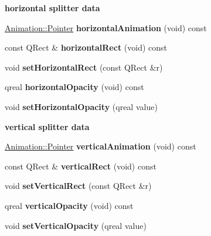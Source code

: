 \begin{Indent}\textbf{ horizontal splitter data}\par
\begin{DoxyCompactItemize}
\item 
\mbox{\label{class_dock_separator_data_a392ea21a3b247c0c32bc185f7919a85b}} 
\hyperlink{class_animation_ac48a8d074abd43dc3f6485353ba24e30}{Animation\+::\+Pointer} {\bfseries horizontal\+Animation} (void) const
\item 
\mbox{\label{class_dock_separator_data_a2ae548ffbc3f67c7ca20e471b423a0c9}} 
const Q\+Rect \& {\bfseries horizontal\+Rect} (void) const
\item 
\mbox{\label{class_dock_separator_data_acca36132c9efd0bcb646a02deaed3faa}} 
void {\bfseries set\+Horizontal\+Rect} (const Q\+Rect \&r)
\item 
\mbox{\label{class_dock_separator_data_a7acc7fad5de94267b1233e004b7f2bf8}} 
qreal {\bfseries horizontal\+Opacity} (void) const
\item 
\mbox{\label{class_dock_separator_data_a63cb32b142f8cd491f59eba0bc8665a9}} 
void {\bfseries set\+Horizontal\+Opacity} (qreal value)
\end{DoxyCompactItemize}
\end{Indent}
\begin{Indent}\textbf{ vertical splitter data}\par
\begin{DoxyCompactItemize}
\item 
\mbox{\label{class_dock_separator_data_a937e6edd7c01a3d4f393e7a5b0e814df}} 
\hyperlink{class_animation_ac48a8d074abd43dc3f6485353ba24e30}{Animation\+::\+Pointer} {\bfseries vertical\+Animation} (void) const
\item 
\mbox{\label{class_dock_separator_data_a637ff49b7031a047b5809197f9a5b37f}} 
const Q\+Rect \& {\bfseries vertical\+Rect} (void) const
\item 
\mbox{\label{class_dock_separator_data_adddd22de1066f87f3e01654c3fe8d69b}} 
void {\bfseries set\+Vertical\+Rect} (const Q\+Rect \&r)
\item 
\mbox{\label{class_dock_separator_data_adae158146c224c27f2d81d91cb0f6692}} 
qreal {\bfseries vertical\+Opacity} (void) const
\item 
\mbox{\label{class_dock_separator_data_a7aa0f77c154ef30a327f9f0d94e90c3c}} 
void {\bfseries set\+Vertical\+Opacity} (qreal value)
\end{DoxyCompactItemize}
\end{Indent}
